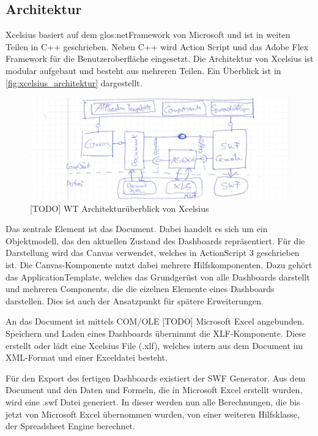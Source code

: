 \subsection{Architektur}

Xcelsius basiert auf dem \gls{glos:netFramework} von Microsoft und ist in weiten Teilen in C++ geschrieben. Neben C++ wird Action Script und das Adobe Flex Framework für die  Benutzeroberfläche eingesetzt. Die Architektur von Xcelsius ist modular aufgebaut und besteht aus mehreren Teilen. Ein Überblick ist in \vref{fig:xcelsius_architektur} dargestellt.

\begin{figure}[h]
\centering
\setlength{\unitlength}{1mm}
\includegraphics[width=15cm]{images/Xcelsius_Architecture.jpg}
\caption{[TODO] WT Architekturüberblick von Xcelsius\label{fig:xcelsius_architektur}}
\end{figure}

Das zentrale Element ist das Document. Dabei handelt es sich um ein Objektmodell, das den aktuellen Zustand des Dashboards repräsentiert. Für die Darstellung wird das Canvas verwendet, welches in ActionScript 3 geschrieben ist. Die Canvas-Komponente nutzt dabei mehrere Hilfskomponenten. Dazu gehört das ApplicationTemplate, welches das Grundgerüst von alle Dashboards darstellt und mehreren Components, die die eizelnen Elemente eines Dashboards darstellen. Dies ist auch der Ansatzpunkt für spätere Erweiterungen.

An das Document ist mittels COM/OLE [TODO] Microsoft Excel angebunden. Speichern und Laden eines Dashboards übernimmt die XLF-Komponente. Diese erstellt oder lädt eine Xcelsius File (.xlf), welches intern aus dem Document im XML-Format und einer Exceldatei besteht.

Für den Export des fertigen Dashboards existiert der SWF Generator. Aus dem Document und den Daten und Formeln, die in Microsoft Excel erstellt wurden, wird eine .swf Datei generiert. In dieser werden nun alle Berechnungen, die bis jetzt von Microsoft Excel übernommen wurden, von einer weiteren Hilfsklasse, der Spreadsheet Engine berechnet.


